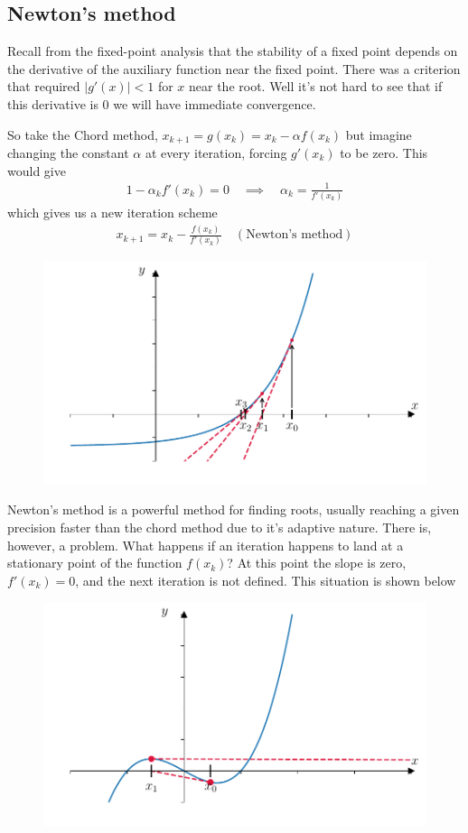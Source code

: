\subsection{Newton's method}

Recall from the fixed-point analysis that the stability of a fixed point depends on the derivative of the auxiliary function near the fixed point. There was a criterion that required $|g'(x)|  < 1$ for $x$ near the root. Well it's not hard to see that if this derivative is 0 we will have immediate convergence.

So take the Chord method, $x_{k+1}=g(x_k) = x_{k} - \alpha f(x_{k})$ but imagine changing the constant $\alpha$ at every iteration, forcing $g'(x_k)$ to be zero. This would give
\begin{align*}
1 - \alpha_k f'(x_{k})=0 \quad\implies\quad \alpha_k = \frac{1}{f'(x_{k})}
\end{align*}
which gives us a new iteration scheme
\begin{align*}
\boxed{x_{k+1} = x_{k} - \frac{ f(x_{k})}{f'(x_{k})} \quad (\text{Newton's method})}
\end{align*}
\begin{figure}[H]
\begin{center}
\includegraphics[width=0.7\linewidth]{figures/ch2_newton2.pdf}  \label{fig:ch2_newton2}
\end{center}
\end{figure}

Newton's method is a powerful method for finding roots, usually reaching a given precision faster than the chord method due to it's adaptive nature. There is, however, a problem. What happens if an iteration happens to land at a stationary point of the function $f(x_k)$? At this point the slope is zero, $f'(x_k)=0$, and the next iteration is not defined. This situation is shown below
\begin{figure}[H]
\begin{center}
\includegraphics[width=0.7\linewidth]{figures/ch2_newton3.pdf}  \label{fig:ch2_newton3}
\end{center}
\end{figure}



